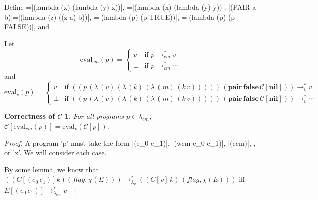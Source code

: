 \documentclass[ms,electronic,twosidetoc,letterpaper,chaptercenter,parttop]{byumsphd}
\begin{document}


Define =\scheme|(lambda (x) (lambda (y) x))|, =\scheme|(lambda (x) (lambda (y) y))|, \scheme|(PAIR a b)|=\scheme|(lambda (z) ((z a) b))|, =\scheme|(lambda (p) (p TRUE))|, =\scheme|(lambda (p) (p FALSE))|, and =.

Let
\[
\mathrm{eval}_{cm}(p)=\begin{cases}
v     &\text{if $p\rightarrow_{cm}^{*}v$}\\
\perp &\text{if $p\rightarrow_{cm}^{*}\cdots$}
\end{cases}
\]
and
\[
\mathrm{eval}_{v}(p)=\begin{cases}
v     &\text{if $((p\,(\lambda\,(v)\,(\lambda\,(k)\,(\lambda\,(m)\,(k\,v)))))\,(\textbf{pair}\,\textbf{false}\,\mathcal{C}[\textbf{nil}]))\rightarrow_{v}^{*}v$}\\
\perp &\text{if $((p\,(\lambda\,(v)\,(\lambda\,(k)\,(\lambda\,(m)\,(k\,v)))))\,(\textbf{pair}\,\textbf{false}\,\mathcal{C}[\textbf{nil}]))\rightarrow_{v}^{*}\cdots$}
\end{cases}
\]

\newtheorem{theorem}{Theorem}
\newtheorem{case}{Case}

\newtheorem*{maintheorem}{Correctness of $\mathcal{C}$}
\begin{maintheorem}
For all programs $p\in\lambda_{cm}$, $\mathcal{C}[\mathrm{eval}_{cm}(p)]=\mathrm{eval}_{v}(\mathcal{C}[p])$.
\end{maintheorem}
\begin{proof}
A program \scheme'p' must take the form \scheme|(e_0 e_1)|, \scheme|(wcm e_0 e_1)|, \scheme|(ccm)|, , or \scheme'x'. We will consider each case.

By some lemma, we know that $((C[(e_0\,e_1)] k) (flag,\chi(E)))\rightarrow_{\lambda_{v}}^{*}((C[v]\,k)\,(flag,\chi(E)))$ iff $E[(e_0\,e_1)]\rightarrow_{\lambda_{cm}}^{*}v$
\end{proof}



\end{document}
